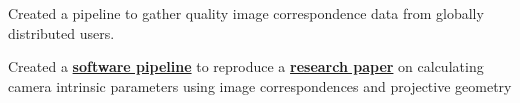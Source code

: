 \documentclass[]{plushcv}
\begin{document}
\begin{minipage}[t]{0.70\textwidth}
    \begin{tightemize}
        \sectionsep
        \item Created a pipeline to gather quality
        image correspondence data from globally distributed users.
        \item Created a
        \textbf{\href{https://github.com/johanos/pollefeys-self-calibration-and-metric-reconstruction}{software pipeline}}
        to reproduce a
        \textbf{\href{https://people.inf.ethz.ch/pomarc/pubs/PollefeysIJCV99.pdf}{research paper}}
        on calculating camera intrinsic parameters using image correspondences and projective geometry

    \end{tightemize}
    \sectionsep


    \sectionsep






\end{minipage}
\end{document}
